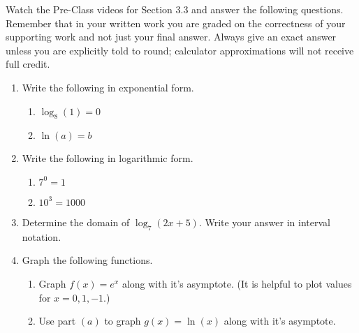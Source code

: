 


\noindent Watch the Pre-Class videos for Section 3.3 and answer the following questions. Remember that in your written work you are graded on the correctness of your supporting work and not just your final answer. Always give an exact answer unless you are explicitly told to round; calculator approximations will not receive full credit. 


\begin{enumerate}
\item  Write the following in exponential form.
\begin{enumerate}
\item $\log_8(1)=0$
\vfill
\item $\ln(a)=b$
\vfill
\end{enumerate}


\item  Write the following in logarithmic form.
\begin{enumerate}
\item $7^0=1$
\vfill
\item $10^3=1000$
\vfill
\end{enumerate}

\item  Determine the domain of $\log_7(2x+5)$.  Write your answer in interval notation.
\vfill
\vfill

\newpage
\item  Graph the following functions.
\begin{enumerate}

\item Graph $\displaystyle f(x)=e^x$ along with it's asymptote.  (It is helpful to plot values for $x=0, 1, -1$.)\\



\item Use part $(a)$ to graph $\displaystyle g(x)=\ln(x)$ along with it's asymptote.\\


\end{enumerate}
\end{enumerate}
